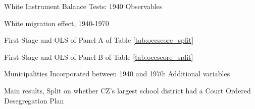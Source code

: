 \documentclass{article}
\begin{document}
\begin{table}[htbp]\centering 
 \begin{threeparttable} \caption{White Instrument Balance Tests: 1940 Observables}\label{tab:balance_white}
     \end{threeparttable} \end{table}

\begin{table}[htbp]\centering {}  \begin{threeparttable} \caption{White migration effect, 1940-1970}
\footnotesize
\label{tab:White_effect}
    
 \end{threeparttable}  \end{table}


\clearpage
\begin{table}[htbp]\centering {}  \begin{threeparttable} \caption{First Stage and OLS of Panel A of Table \ref{tab:occscore_split}}
\scriptsize
\label{tab:links_fs_ols}
    
 \end{threeparttable}  \end{table}


\clearpage
\begin{table}[htbp]\centering {}  \begin{threeparttable} \caption{First Stage and OLS of Panel B of Table \ref{tab:occscore_split}}
\scriptsize
\label{tab:diffs_fs_ols}
    
\end{threeparttable}
\end{table}
\clearpage

\clearpage


    

\clearpage

\begin{table}[htbp]
\footnotesize
\centering {}  
\caption{Municipalities Incorporated between 1940 and 1970: Additional variables}\label{tab:touching_pct_rev_debt}
\begin{threeparttable}
\scriptsize 
       
    \end{threeparttable}
    \end{table}
\clearpage

\begin{table}[htbp]
\footnotesize
\centering {}  
\caption{Main results, Split on whether CZ's largest school district had a Court Ordered Desegregation Plan}\label{tab:co_split}
\begin{threeparttable}
\scriptsize 
    
    
    \end{threeparttable}
    \end{table}
\clearpage
\end{document}
